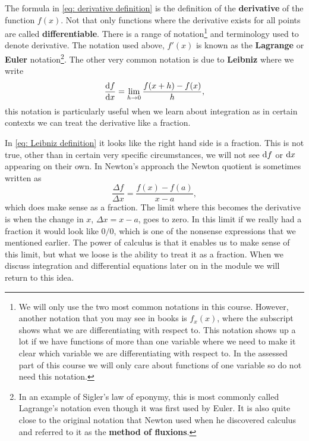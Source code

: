 The formula in \cref{eq: derivative definition} is the definition of the \textbf{derivative} of the function $f(x)$. Not that only functions where the derivative exists for all points are called \textbf{differentiable}. There is a range of notation\footnote{We will only use the two most common notations in this course. However, another notation that you may see in books is $f_{x}(x)$, where the subscript shows what we are differentiating with respect to. This notation shows up a lot if we have functions of more than one variable where we need to make it clear which variable we are differentiating with respect to. In the assessed part of this course we will only care about functions of one variable so do not need this notation.} and terminology used to denote derivative. The notation used above,  $f'(x)$ is known as the \textbf{Lagrange} or \textbf{Euler} notation\footnote{In an example of Sigler's law of eponymy, this is most commonly called Lagrange's notation even though it was first used by Euler. It is also quite close to the original notation that Newton used when he discovered calculus and referred to it as the \textbf{method of fluxions}. }.  The other very common notation is due to \textbf{Leibniz} where we write
\begin{equation}
\frac{\mathrm{d} f}{\mathrm{d} x}=\lim_{h\to 0}\frac{f(x+h)-f(x)}{h},
\label{eq: Leibniz definition}
\end{equation}
this notation is particularly useful when we learn about integration as in certain contexts we can treat the derivative like a fraction.\\

\begin{mdiv}
In \cref{eq: Leibniz definition} it looks like the right hand side is a fraction. This is not true, other than in certain very specific circumstances, we will not see $\mathrm{d} f$ or $\mathrm{d} x$ appearing on their own. In Newton's approach the Newton quotient is sometimes written as
\begin{equation*}
\frac{\Delta f}{\Delta x}=\frac{f(x)-f(a)}{x-a},
\end{equation*}
which does make sense as a fraction. The limit where this becomes the derivative is when the change in $x$, $\Delta x=x-a$, goes to zero. In this limit if we really had a fraction it would look like $0/0$, which is one of the nonsense expressions that we mentioned earlier. The power of calculus is that it enables us to make sense of this limit, but what we loose is the ability to treat it as a fraction. When we discuss integration and differential equations later on in the module we will return to this idea.
\end{mdiv}

